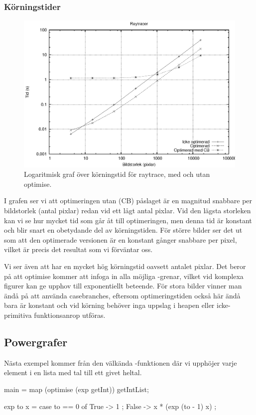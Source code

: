 \documentclass[Rapport]{subfiles}
\begin{document}
\subsubsection{Körningstider}


\begin{figure}[H]
\includegraphics{shapes.eps}
\caption{Logaritmisk graf över körningstid för raytrace, med och utan optimise.}
\label{fig:Resultat:shapes:graf}
\end{figure}

I grafen ser vi att optimeringen utan  (CB) påslaget är en
magnitud snabbare per bildstorlek (antal pixlar) redan vid ett lågt antal pixlar.
Vid den lägsta storleken kan vi se hur mycket tid som går åt till optimeringen,
men denna tid är konstant och blir snart en obetydande del av körningstiden. För
större bilder ser det ut som att den optimerade versionen är en konstant gånger
snabbare per pixel, vilket är precis det resultat som vi förväntar oss.

Vi ser även att  har en mycket hög körningstid oavsett antalet pixlar. 
Det beror på att optimise kommer att infoga in alla möjliga -grenar, 
vilket vid komplexa figurer kan ge upphov till exponentiellt beteende.
För stora bilder vinner man ändå på att använda casebranches, eftersom optimeringstiden
också här ändå bara är konstant och vid körning behöver inga uppslag i heapen eller icke-primitiva funktionsanrop utföras. 


\subsection{Powergrafer}
Nästa exempel kommer från den välkända -funktionen där vi upphöjer varje element i en lista med tal till ett givet heltal. 
\begin{codeEx}
main = map (optimise (exp getInt)) getIntList;

exp to x = case to == 0 of
    { True  -> 1
    ; False -> x * (exp (to - 1) x)
    };
\end{codeEx}
\end{document}
